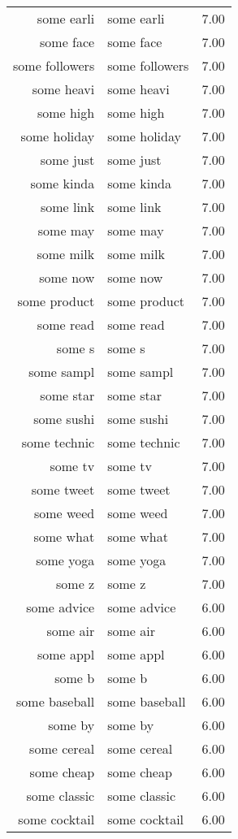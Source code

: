 \begin{table}[ht]
\begin{tabular}{rlr}
  some earli & some earli & 7.00 \\ 
  some face & some face & 7.00 \\ 
  some followers & some followers & 7.00 \\ 
  some heavi & some heavi & 7.00 \\ 
  some high & some high & 7.00 \\ 
  some holiday & some holiday & 7.00 \\ 
  some just & some just & 7.00 \\ 
  some kinda & some kinda & 7.00 \\ 
  some link & some link & 7.00 \\ 
  some may & some may & 7.00 \\ 
  some milk & some milk & 7.00 \\ 
  some now & some now & 7.00 \\ 
  some product & some product & 7.00 \\ 
  some read & some read & 7.00 \\ 
  some s & some s & 7.00 \\ 
  some sampl & some sampl & 7.00 \\ 
  some star & some star & 7.00 \\ 
  some sushi & some sushi & 7.00 \\ 
  some technic & some technic & 7.00 \\ 
  some tv & some tv & 7.00 \\ 
  some tweet & some tweet & 7.00 \\ 
  some weed & some weed & 7.00 \\ 
  some what & some what & 7.00 \\ 
  some yoga & some yoga & 7.00 \\ 
  some z & some z & 7.00 \\ 
  some advice & some advice & 6.00 \\ 
  some air & some air & 6.00 \\ 
  some appl & some appl & 6.00 \\ 
  some b & some b & 6.00 \\ 
  some baseball & some baseball & 6.00 \\ 
  some by & some by & 6.00 \\ 
  some cereal & some cereal & 6.00 \\ 
  some cheap & some cheap & 6.00 \\ 
  some classic & some classic & 6.00 \\ 
  some cocktail & some cocktail & 6.00 \\ 

\end{tabular}
\end{table}
